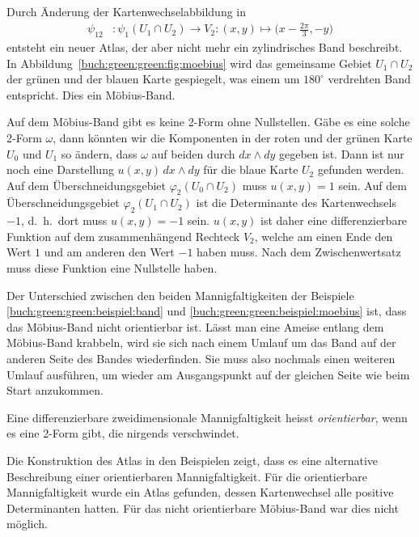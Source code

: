 \begin{beispiel}
\label{buch:green:green:beispiel:moebius}
%
Durch Änderung der Kartenwechselabbildung in
\begin{align*}
\psi_{12}&\colon
\psi_1(U_1\cap U_2)
\to
V_2
:(x,y) \mapsto \biggl(x-\frac{2\pi}3,-y\biggr)
\end{align*}
entsteht ein neuer Atlas, der aber nicht mehr ein zylindrisches Band
beschreibt.
In Abbildung~\ref{buch:green:green:fig:moebius} wird das gemeinsame
Gebiet $U_1\cap U_2$ der grünen und der blauen Karte gespiegelt,
was einem um $180^\circ$ verdrehten Band entspricht.
Dies ein Möbius-Band.

Auf dem Möbius-Band gibt es keine 2-Form ohne Nullstellen.
Gäbe es eine solche 2-Form $\omega$, dann könnten wir die Komponenten
in der roten und der grünen Karte $U_0$ und $U_1$ so ändern, dass
$\omega$ auf beiden durch $dx\wedge dy$ gegeben ist.
Dann ist nur noch eine Darstellung $u(x,y)\,dx\wedge dy$ für die 
blaue Karte $U_2$ gefunden werden.
Auf dem Überschneidungsgebiet $\varphi_2(U_0\cap U_2)$ muss $u(x,y)=1$
sein.
Auf dem Überschneidungsgebiet $\varphi_2(U_1\cap U_2)$ ist die 
Determinante des Kartenwechsels $-1$, d.~h.~dort muss $u(x,y)=-1$
sein.
$u(x,y)$ ist daher eine differenzierbare Funktion auf dem zusammenhängend
Rechteck $V_2$, welche am einen Ende den Wert $1$ und am anderen den 
Wert $-1$ haben muss.
Nach dem Zwischenwertsatz muss diese Funktion eine Nullstelle haben.
\end{beispiel}

Der Unterschied zwischen den beiden Mannigfaltigkeiten der Beispiele
\ref{buch:green:green:beispiel:band}
und
\ref{buch:green:green:beispiel:moebius}
ist, dass das Möbius-Band nicht orientierbar ist.
Lässt man eine Ameise entlang dem Möbius-Band krabbeln, wird sie
sich nach einem Umlauf um das Band auf der anderen Seite des Bandes
wiederfinden.
Sie muss also nochmals einen weiteren Umlauf ausführen, um wieder
am Ausgangspunkt auf der gleichen Seite wie beim Start anzukommen.

\begin{definition}
Eine differenzierbare zweidimensionale Mannigfaltigkeit heisst 
{\em orientierbar}, wenn es eine 2-Form gibt, die nirgends
verschwindet.
\end{definition}

Die Konstruktion des Atlas in den Beispielen zeigt, dass es eine
alternative Beschreibung einer orientierbaren Mannigfaltigkeit.
Für die orientierbare Mannigfaltigkeit wurde ein Atlas gefunden,
dessen Kartenwechsel alle positive Determinanten hatten.
Für das nicht orientierbare Möbius-Band war dies nicht möglich.

